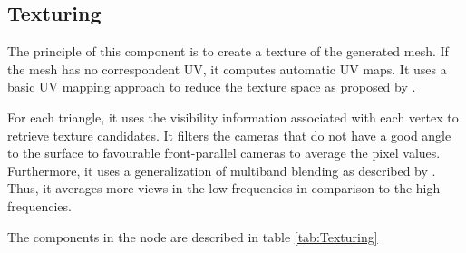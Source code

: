 \documentclass[12pt]{report}
\begin{document}
  \subsection{Texturing}
  The principle of this component is to create a texture of the generated mesh.
  If the mesh has no correspondent UV, it computes automatic UV maps. It uses a basic UV mapping approach to reduce the texture space as proposed by .
  
  For each triangle, it uses the visibility information associated with each vertex to retrieve texture candidates.
  It filters the cameras that do not have a good angle to the surface to favourable front-parallel cameras to average the pixel values.
  Furthermore, it uses a generalization of multiband blending as described by . Thus, it averages more views in the low frequencies in comparison to the high frequencies.
  
  The components in the node are described in table \ref{tab:Texturing}
  
\end{document}
